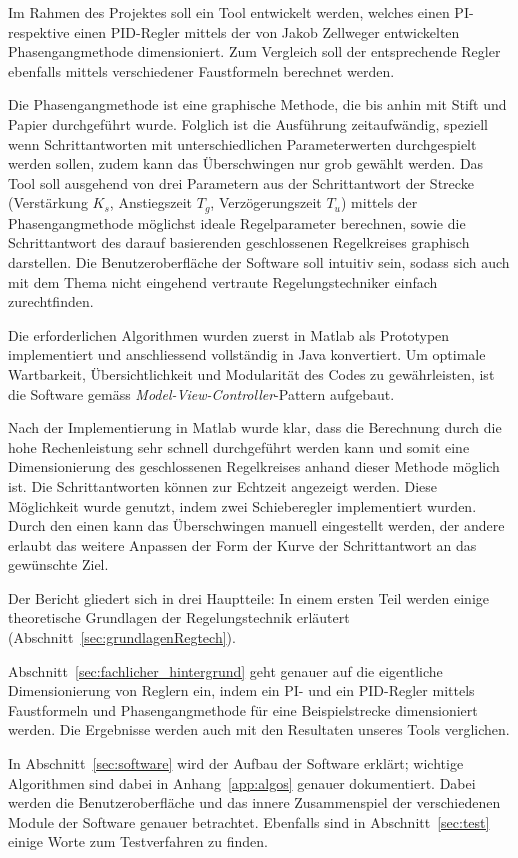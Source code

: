Im Rahmen  des Projektes soll  ein Tool  entwickelt werden, welches  einen PI-
respektive  einen  PID-Regler mittels  der  von  Jakob Zellweger  entwickelten
Phasengangmethode dimensioniert. Zum  Vergleich soll der  entsprechende Regler
ebenfalls mittels verschiedener Faustformeln berechnet werden.

Die Phasengangmethode ist eine graphische Methode, die bis anhin mit Stift und
Papier  durchgef\"uhrt wurde. Folglich  ist die  Ausf\"uhrung zeitaufw\"andig,
speziell   wenn   Schrittantworten   mit   unterschiedlichen   Parameterwerten
durchgespielt werden sollen, zudem kann das \"Uberschwingen nur grob gew\"ahlt
werden. Das Tool  soll ausgehend  von drei  Parametern aus  der Schrittantwort
der  Strecke  (Verst\"arkung  $K_s$,  Anstiegszeit  $T_g$,  Verz\"ogerungszeit
$T_u$)  mittels   der  Phasengangmethode  m\"oglichst   ideale  Regelparameter
berechnen,  sowie  die  Schrittantwort des  darauf  basierenden  geschlossenen
Regelkreises graphisch darstellen. Die  Benutzeroberfl\"ache der Software soll
intuitiv  sein, sodass  sich  auch  mit dem  Thema  nicht eingehend  vertraute
Regelungstechniker einfach zurechtfinden.

Die    erforderlichen    Algorithmen    wurden   zuerst    in    Matlab    als
Prototypen   implementiert    und   anschliessend   vollst\"andig    in   Java
konvertiert. Um  optimale Wartbarkeit,  \"Ubersichtlichkeit und  Modularit\"at
des    Codes     zu    gew\"ahrleisten,    ist    die     Software    gem\"ass
\emph{Model-View-Controller}-Pattern aufgebaut.

Nach der Implementierung  in Matlab wurde klar, dass die  Berechnung durch die
hohe Rechenleistung  sehr schnell  durchgef\"uhrt werden  kann und  somit eine
Dimensionierung des geschlossenen Regelkreises anhand dieser Methode m\"oglich
ist. Die  Schrittantworten  k\"onnen   zur  Echtzeit  angezeigt  werden. Diese
M\"oglichkeit   wurde   genutzt,   indem  zwei   Schieberegler   implementiert
wurden. Durch den  einen kann das \"Uberschwingen  manuell eingestellt werden,
der andere erlaubt das weitere Anpassen  der Form der Kurve der Schrittantwort
an das gew\"unschte Ziel.

Der  Bericht   gliedert  sich  in   drei  Hauptteile: In  einem   ersten  Teil
werden  einige   theoretische  Grundlagen  der   Regelungstechnik  erl\"autert
(Abschnitt~\ref{sec:grundlagenRegtech}).

Abschnitt~\ref{sec:fachlicher_hintergrund}  geht genauer  auf die  eigentliche
Dimensionierung  von Reglern  ein, indem  ein PI-  und ein  PID-Regler mittels
Faustformeln  und Phasengangmethode  f\"ur eine  Beispielstrecke dimensioniert
werden. Die  Ergebnisse   werden  auch   mit  den  Resultaten   unseres  Tools
verglichen.

In    Abschnitt~\ref{sec:software}    wird    der    Aufbau    der    Software
erkl\"art;   wichtige  Algorithmen   sind   dabei  in   Anhang~\ref{app:algos}
genauer   dokumentiert. Dabei   werden   die  Benutzeroberfl\"ache   und   das
innere   Zusammenspiel  der   verschiedenen   Module   der  Software   genauer
betrachtet. Ebenfalls  sind  in   Abschnitt~\ref{sec:test}  einige  Worte  zum
Testverfahren zu finden.

